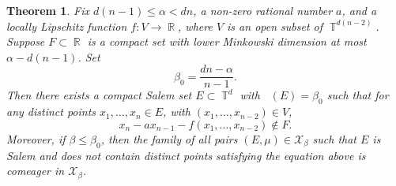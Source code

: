 \documentclass[dvipsnames,letterpaper,12pt]{article}
\numberwithin{equation}{section}
\DeclareMathOperator{\fordim}{\dim_{\mathbb{F}}}
\DeclareMathOperator{\RR}{\mathbb{R}}
\DeclareMathOperator{\TT}{\mathbb{T}}
\newtheorem{theorem}{Theorem}
\newtheorem{remark}[theorem]{Remark}
\numberwithin{theorem}{section}
\begin{document}
\begin{theorem} \label{thirdTheorem}
    Fix $d(n-1) \leq \alpha < dn$, a non-zero rational number $a$, and a locally Lipschitz function $f: V \to \RR$, where $V$ is an open subset of $\TT^{d(n-2)}$. Suppose $F \subset \RR$ is a compact set with lower Minkowski dimension at most $\alpha - d(n-1)$. Set
    \[ \beta_0 = \frac{dn - \alpha}{n - 1}. \]
    Then there exists a compact Salem set $E \subset \TT^d$ with $\fordim(E) = \beta_0$ such that for any distinct points $x_1,\dots,x_n \in E$, with $(x_1,\dots,x_{n-2}) \in V$,
    \[ x_n - a x_{n-1} - f(x_1,\dots,x_{n-2}) \not \in F. \]
    Moreover, if $\beta \leq \beta_0$, then the family of all pairs $(E,\mu) \in \mathcal{X}_\beta$ such that $E$ is Salem and does not contain distinct points satisfying the equation above is comeager in $\mathcal{X}_\beta$.
\end{theorem}


\end{document}
